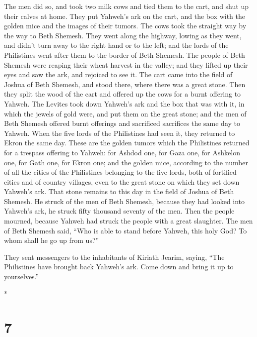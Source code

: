 \begin{paracol}{2}
\begin{otherlanguage}{english}
 The men did so, and took two milk cows and tied them to
the cart, and shut up their calves at home.  They put
Yahweh's ark on the cart, and the box with the golden mice and the
images of their tumors.  The cows took the straight way
by the way to Beth Shemesh. They went along the highway, lowing as they
went, and didn't turn away to the right hand or to the left; and the
lords of the Philistines went after them to the border of Beth Shemesh.
 The people of Beth Shemesh were reaping their wheat
harvest in the valley; and they lifted up their eyes and saw the ark,
and rejoiced to see it.  The cart came into the field of
Joshua of Beth Shemesh, and stood there, where there was a great stone.
Then they split the wood of the cart and offered up the cows for a burnt
offering to Yahweh.  The Levites took down Yahweh's ark
and the box that was with it, in which the jewels of gold were, and put
them on the great stone; and the men of Beth Shemesh offered burnt
offerings and sacrificed sacrifices the same day to Yahweh.
 When the five lords of the Philistines had seen it, they
returned to Ekron the same day.  These are the golden
tumors which the Philistines returned for a trespass offering to Yahweh:
for Ashdod one, for Gaza one, for Ashkelon one, for Gath one, for Ekron
one;  and the golden mice, according to the number of all
the cities of the Philistines belonging to the five lords, both of
fortified cities and of country villages, even to the great stone on
which they set down Yahweh's ark. That stone remains to this day in the
field of Joshua of Beth Shemesh.  He struck of the men of
Beth Shemesh, because they had looked into Yahweh's ark, he struck fifty
thousand seventy of the men. Then the people mourned, because Yahweh had
struck the people with a great slaughter.  The men of
Beth Shemesh said, ``Who is able to stand before Yahweh, this holy God?
To whom shall he go up from us?''

 They sent messengers to the inhabitants of Kiriath
Jearim, saying, ``The Philistines have brought back Yahweh's ark. Come
down and bring it up to yourselves.''

\end{otherlanguage}

\switchcolumn[0]*

\hypertarget{section-12}{%
\section{7}\label{section-12}}


\end{paracol}
